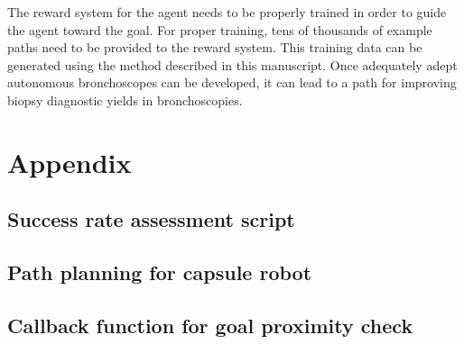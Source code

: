 \documentclass[conference]{IEEEtran}
\begin{document}
The reward system for the agent needs to be properly trained in order to guide the agent
toward the goal. For proper training, tens of thousands of example paths need to be
provided to the reward system. This training data can be generated using the method
described in this manuscript. Once adequately adept autonomous bronchoscopes can be
developed, it can lead to a path for improving biopsy diagnostic yields in bronchoscopies.

\vspace{0.4in}

\section{Appendix}

\subsection{Success rate assessment script}



\subsection{Path planning for capsule robot}



\subsection{Callback function for goal proximity check}





\end{document}
